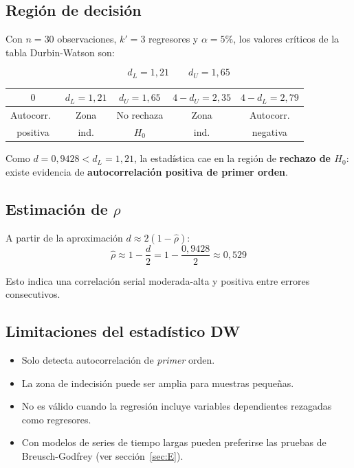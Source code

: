 \documentclass[12pt,a4paper]{article}
\begin{document}
\subsection{Región de decisión}

Con $n=30$ observaciones, $k'=3$ regresores y $\alpha=5\%$, los valores
críticos de la tabla Durbin-Watson son:

\[
  d_L = 1{,}21 \qquad d_U = 1{,}65
\]

\begin{center}
\begin{tabular}{ccccc}
  \toprule
  $0$ & $d_L=1{,}21$ & $d_U=1{,}65$ & $4-d_U=2{,}35$ & $4-d_L=2{,}79$ \\
  \midrule
  Autocorr.\ & Zona  & No rechaza & Zona  & Autocorr. \\
  positiva   & ind.  & $H_0$      & ind.  & negativa  \\
  \bottomrule
\end{tabular}
\end{center}

Como $d = 0{,}9428 < d_L = 1{,}21$, la estadística cae en la región de
\textbf{rechazo de $H_0$}: existe evidencia de \textbf{autocorrelación
positiva de primer orden}.

\subsection{Estimación de $\rho$}

A partir de la aproximación $d \approx 2(1-\hat\rho)$:
\[
  \hat\rho \approx 1 - \frac{d}{2} = 1 - \frac{0{,}9428}{2} \approx 0{,}529
\]

Esto indica una correlación serial moderada-alta y positiva entre errores
consecutivos.

\subsection{Limitaciones del estadístico DW}

\begin{itemize}
  \item Solo detecta autocorrelación de \emph{primer} orden.
  \item La zona de indecisión puede ser amplia para muestras pequeñas.
  \item No es válido cuando la regresión incluye variables dependientes
        rezagadas como regresores.
  \item Con modelos de series de tiempo largas pueden preferirse las
        pruebas de Breusch-Godfrey (ver sección~\ref{sec:E}).
\end{itemize}
\end{document}
